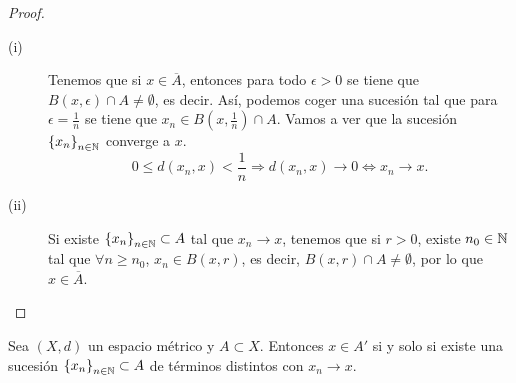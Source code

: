 \begin{proof}
\begin{description}
	\item[(i)] Tenemos que si $\displaystyle x \in \overline{A} $, entonces para todo $\displaystyle \epsilon > 0 $ se tiene que $\displaystyle B\left(x,\epsilon \right) \cap A \neq \emptyset $, es decir. Así, podemos coger una sucesión tal que para $\displaystyle \epsilon = \frac{1}{n} $ se tiene que $\displaystyle x_{n} \in B\left(x,\frac{1}{n}\right) \cap A $. Vamos a ver que la sucesión $\displaystyle \left\{ x_{n}\right\} _{n\in\mathbb{N}} $ converge a $\displaystyle x $. 
		\[0 \leq d\left(x_{n}, x\right) < \frac{1}{n} \Rightarrow d\left(x_{n}, x\right) \to 0 \iff x_{n} \to x .\]
	\item[(ii)] Si existe $\displaystyle \left\{ x_{n}\right\} _{n\in\mathbb{N}} \subset A $ tal que $\displaystyle x_{n} \to x $, tenemos que si $\displaystyle r > 0 $, existe $\displaystyle n_{0} \in \mathbb{N} $ tal que $\displaystyle \forall n \geq n_{0} $, $\displaystyle x_{n} \in B\left(x, r\right) $, es decir, $\displaystyle B\left(x,r\right) \cap A \neq \emptyset $, por lo que $\displaystyle x \in \overline{A} $.
\end{description}
\end{proof}
\begin{prop}
	Sea $\displaystyle \left(X,d\right) $ un espacio métrico y $\displaystyle A \subset X $. Entonces $\displaystyle x \in A' $ si y solo si existe una sucesión $\displaystyle \left\{ x_{n}\right\} _{n\in\mathbb{N}} \subset A$ de términos distintos con $\displaystyle x_{n} \to x $.
\end{prop}
